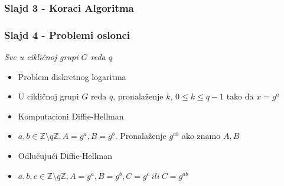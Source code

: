 \documentclass[14pt]{beamer}
\begin{document}
\begin{frame}[fragile]\frametitle{Slajd 3 - Koraci Algoritma}
    \begin{table}[h]
        \begin{center}
        \caption{Tajnost promenljivih u toku algoritma}
        \end{center}
    \end{table}

\end{frame}

\begin{frame}[fragile]\frametitle{Slajd 4 - Problemi oslonci}
    \small
    \emph{Sve u cikličnoj grupi $G$ reda $q$}
	\begin{itemize}	
		\item Problem diskretnog logaritma
        \item[] U cikličnoj grupi $G$ reda $q$, pronalaženje $k$, $0 \le k \le q - 1$ tako da $x = g^a$ %
        \item Komputacioni Diffie-Hellman
        \item[] $a, b \in \mathbb{Z}\setminus q\mathbb{Z}, A = g^a, B = g^b$. Pronalaženje $g^{ab}$ ako znamo $A,B$ %
        \item Odlučujući Diffie-Hellman
        \item[] $a, b, c \in \mathbb{Z}\setminus q\mathbb{Z}, A=g^a, B=g^b, C=g^c\ ili\ C=g^{ab}$
	\end{itemize}
\end{frame}
\end{document}

